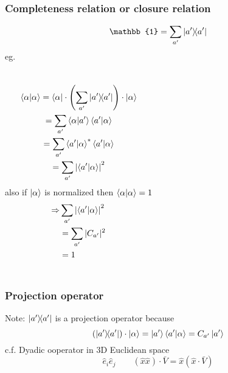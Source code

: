 \begin{frame}
	\frametitle{Completeness relation or closure relation}
	$$
		\mathbb{1} = \sum_{a'} \op{a'}
	$$
	eg.
	\begin{columns}
		\begin{gather*}
			\ip{\alpha} = \bra{\alpha} \cdot \qty(\sum_{a'}\op{a'}) \cdot \ket{\alpha}	\\
			= \sum_{a'} \ip{\alpha}{a'}\ip{a'}{\alpha}\\
			= \sum_{a'} \ip{a'}{\alpha}^*\ip{a'}{\alpha}\\
			= \sum_{a'} \qty|\ip{a'}{\alpha}|^2
		\end{gather*}
		also if $\ket{\alpha}$ is normalized then $\ip{\alpha}  = 1$
		\begin{align*}
			\Rightarrow & \sum_{a'} \qty|\ip{a'}{\alpha}|^2 \\
			            & = \sum_{a'} |C_{a'}|^2            \\
			            & = 1
		\end{align*}
	\end{columns}
\end{frame}
\begin{frame}
	\frametitle{Projection operator}

	Note: $\op{a'}$ is a projection operator because
	\[
		\qty(\op{a'})\cdot \ket{\alpha} = \ket{a'} \ip{a'}{\alpha} = C_{a'} \ket{a'}
	\]
	c.f. Dyadic ooperator in 3D Euclidean space
	\[\hat e_i \hat e_j \qquad (\hat x \hat x) \cdot \bar V = \hat x (\hat x \cdot \bar V)\]
\end{frame}
